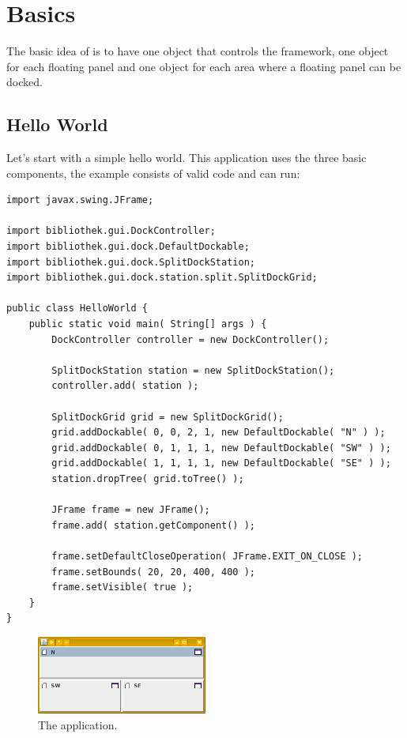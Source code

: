 \section{Basics} \label{sec:basics}
The basic idea of  is to have one object that controls the framework, one object for each floating panel and one object for each area where a floating panel can be docked.


\subsection{Hello World}
Let's start with a simple hello world. This application uses the three basic components, the example consists of valid code and can run:
\begin{lstlisting}
import javax.swing.JFrame;

import bibliothek.gui.DockController;
import bibliothek.gui.dock.DefaultDockable;
import bibliothek.gui.dock.SplitDockStation;
import bibliothek.gui.dock.station.split.SplitDockGrid;

public class HelloWorld {
	public static void main( String[] args ) {
		DockController controller = new DockController();

		SplitDockStation station = new SplitDockStation();
		controller.add( station );
	
		SplitDockGrid grid = new SplitDockGrid();
		grid.addDockable( 0, 0, 2, 1, new DefaultDockable( "N" ) );
		grid.addDockable( 0, 1, 1, 1, new DefaultDockable( "SW" ) );
		grid.addDockable( 1, 1, 1, 1, new DefaultDockable( "SE" ) );
		station.dropTree( grid.toTree() );
	
		JFrame frame = new JFrame();
		frame.add( station.getComponent() );
	
		frame.setDefaultCloseOperation( JFrame.EXIT_ON_CLOSE );
		frame.setBounds( 20, 20, 400, 400 );
		frame.setVisible( true );
	}
}
\end{lstlisting}

\begin{figure}[h!]
  \centering
    \includegraphics[width=0.5\textwidth]{basics/HelloWorld}
  \caption{The  application.}
\end{figure}


